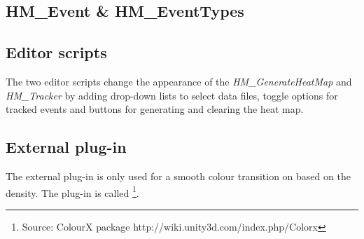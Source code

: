 \subsection{HM\_Event & HM\_EventTypes}
\label{CO_Event}

\subsection{Editor scripts}
\label{CO_Editor}
The two editor scripts change the appearance of the \textit{HM\_GenerateHeatMap} and \textit{HM\_Tracker} by adding drop-down lists to select data files, toggle options for tracked events and buttons for generating and clearing the heat map.
\subsection{External plug-in}
\label{CO_PlugIn}
The external plug-in is only used for a smooth colour transition on based on the density. The plug-in is called \footnote{Source: ColourX package http://wiki.unity3d.com/index.php/Colorx}.
